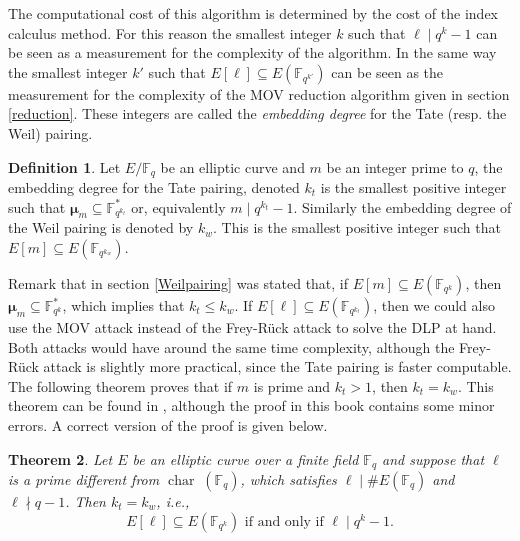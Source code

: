 \documentclass{article}
\numberwithin{equation}{section}
\newtheorem{theorem}{Theorem}[subsection]
\theoremstyle{definition}
\newtheorem{definition}[theorem]{Definition}
\newcommand{\FF}[1]{{\mathbb F}_{#1}} %
\newcommand{\rou}[1]{\boldsymbol{\mu}_{#1}} %
\begin{document}
The computational cost of this algorithm is determined by the cost of the index calculus method. For this reason the smallest integer $k$ such that $\ell \mid q^k-1$ can be seen as a measurement for the complexity of the algorithm. In the same way the smallest integer $k'$ such that $E[\ell] \subseteq E(\FF{q^{k'}})$ can be seen as the measurement for the complexity of the MOV reduction algorithm given in section \ref{reduction}. These integers are called the \emph{embedding degree} for the Tate (resp. the Weil) pairing.

\begin{definition}
Let $E/\FF{q}$ be an elliptic curve and $m$ be an integer prime to $q$, the embedding degree for the Tate pairing, denoted $k_t$ is the smallest positive integer such that $\rou{m} \subseteq \FF{q^{k_t}}^*$ or, equivalently $m \mid q^{k_t}-1$. Similarly the embedding degree of the Weil pairing is denoted by $k_w$. This is the smallest positive integer such that $E[m] \subseteq E(\FF{q^{k_w}})$. 
\end{definition}

Remark that in section \ref{Weilpairing} was stated that, if $E[m]\subseteq E(\FF{q^k})$, then $\rou{m} \subseteq \FF{q^k}^*$, which implies that $k_t \leq k_w$. If $E[\ell] \subseteq E(\FF{q^{k_t}})$, then we could also use the MOV attack instead of the Frey-R\"uck attack to solve the DLP at hand. Both attacks would have around the same time complexity, although the Frey-R\"uck attack is slightly more practical, since the Tate pairing is faster computable. The following theorem proves that if $m$ is prime and $k_t >1$, then $k_t=k_w$. This theorem can be found in \cite[5.3.2]{Washington}, although the proof in this book contains some minor errors. A correct version of the proof is given below.

\begin{theorem}
Let $E$ be an elliptic curve over a finite field $\FF{q}$ and suppose that $\ell$ is a prime different from $\operatorname{char}\;(\FF{q})$, which satisfies $\ell \mid \#E(\FF{q})$ and $\ell \nmid q-1$. Then $k_t=k_w$, i.e., $$E[\ell] \subseteq E(\FF{q^k}) \text{ if and only if } \ell \mid q^k-1.$$
\end{theorem}  
\end{document}
